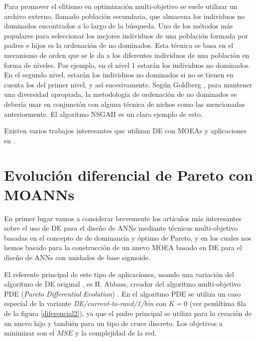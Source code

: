Para promover el elitismo en optimización multi-objetivo se suele utilizar un archivo
externo, llamado población secundaria, que almacena los individuos no dominados
encontrados a lo largo de la búsqueda. Uno de los métodos más populares para seleccionar
los mejores individuos de una población formada por padres e hijos es la ordenación de
no dominados. Esta técnica se basa en el mecanismo de orden que se le da a los diferentes
individuos de una población en forma de niveles. Por ejemplo, en el nivel 1 estarán los
individuos no dominados. En el segundo nivel, estarán los individuos no dominados si no
se tienen en cuenta los del primer nivel, y así sucesivamente. Según Goldberg
\cite{Golberg1989}, para mantener una diversidad apropiada, la metodología de ordenación
de no dominados se debería usar en conjunción con alguna técnica de nichos como las
mencionadas anteriormente. El algoritmo NSGAII \cite{Deb2002} es un claro ejemplo de esto.

Existen varios trabajos interesantes que utilizan DE con MOEAs y aplicaciones en
\cite{Price2005,Chakraborty2008,Mezuza2008}.

\section{Evolución diferencial de Pareto con MOANNs}
\noindent En primer lugar vamos a considerar brevemente los artículos más interesantes
sobre el uso de DE para el diseño de ANNs mediante técnicas multi-objetivo basadas en el concepto de
de dominancia y óptimo de Pareto, y en los cuales nos hemos basado para la construcción
de un
nuevo MOEA basado en DE para el diseño de ANNs con unidades de base sigmoide.

El referente principal de este tipo de aplicaciones, usando una variación del algoritmo de
DE original \cite{Storn1997}, es H. Abbass, creador del algoritmo multi-objetivo PDE
(\textit{Pareto Differential Evolution}) \cite{Abbass2001-1,Abbass2002a}. En el algoritmo
PDE se utiliza un caso especial de la variante \textit{DE/current-to-rand/1/bin} con $K=0$
(ver penúltima fila de la figura \ref{diferencial2}), ya que el padre principal se utiliza
para la creación de un nuevo hijo y también para un tipo de cruce discreto. Los objetivos a
minimizar son el $MSE$ y la complejidad de la red.


